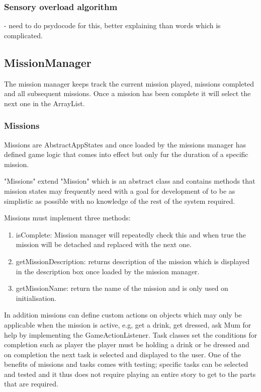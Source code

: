 \subsubsection{Sensory overload algorithm}
- need to do psydocode for this, better explaining than words which is complicated. 


\subsection{MissionManager}
The mission manager keeps track the current mission played, missions completed and all subsequent missions. Once a mission has been complete it will select the next one in the ArrayList. 


\subsubsection*{Missions}
Missions are AbstractAppStates and once loaded by the missions manager has defined game logic that comes into effect but only fur the duration of a specific mission. 

"Missions" extend "Mission" which is an abstract class and contains methods that mission states may frequently need with a goal for development of to be as simplistic as possible with no knowledge of the rest of the system required.

Missions must implement three methods:
\begin{enumerate}
\item isComplete: Mission manager will repeatedly check this and when true the mission will be detached and replaced with the next one. 
\item getMissionDescription: returns description of the mission which is displayed in the description box once loaded by the mission manager. 
\item getMissionName: return the name of the mission and is only used on initialisation. 
\end{enumerate}

In addition missions can define custom actions on objects which may only be applicable when the mission is active, e.g, get a drink, get dressed, ask Mum for help by implementing the GameActionListener. Task classes set the conditions for completion such as player the player must be holding a drink or be dressed and on completion the next task is selected and displayed to the user. One of the benefits of missions and tasks comes with testing; specific tasks can be selected and tested and it thus does not require playing an entire story to get to the parts that are required.

